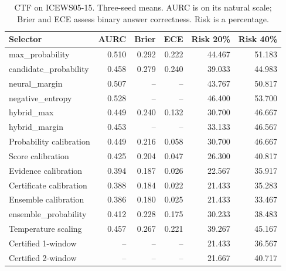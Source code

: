 \begin{table}[H]\centering\small\caption{CTF on ICEWS05-15. Three-seed means. AURC is on its natural scale; Brier and ECE assess binary answer correctness. Risk is a percentage.}\begin{tabular}{lrrrrr}\toprule Selector & AURC & Brier & ECE & Risk 20\% & Risk 40\%\\\midrule
max\_probability & 0.510 & 0.292 & 0.222 & 44.467 & 51.183\\
candidate\_probability & 0.458 & 0.279 & 0.240 & 39.033 & 44.983\\
neural\_margin & 0.507 & -- & -- & 43.767 & 50.817\\
negative\_entropy & 0.528 & -- & -- & 46.400 & 53.700\\
hybrid\_max & 0.449 & 0.240 & 0.132 & 30.700 & 46.667\\
hybrid\_margin & 0.453 & -- & -- & 33.133 & 46.567\\
Probability calibration & 0.449 & 0.216 & 0.058 & 30.700 & 46.667\\
Score calibration & 0.425 & 0.204 & 0.047 & 26.300 & 40.817\\
Evidence calibration & 0.394 & 0.187 & 0.026 & 22.567 & 35.917\\
Certificate calibration & 0.388 & 0.184 & 0.022 & 21.433 & 35.283\\
Ensemble calibration & 0.386 & 0.180 & 0.025 & 21.433 & 33.467\\
ensemble\_probability & 0.412 & 0.228 & 0.175 & 30.233 & 38.483\\
Temperature scaling & 0.457 & 0.267 & 0.221 & 39.267 & 45.167\\
Certified 1-window & -- & -- & -- & 21.433 & 36.567\\
Certified 2-window & -- & -- & -- & 21.667 & 40.717\\
\bottomrule\end{tabular}\end{table}
